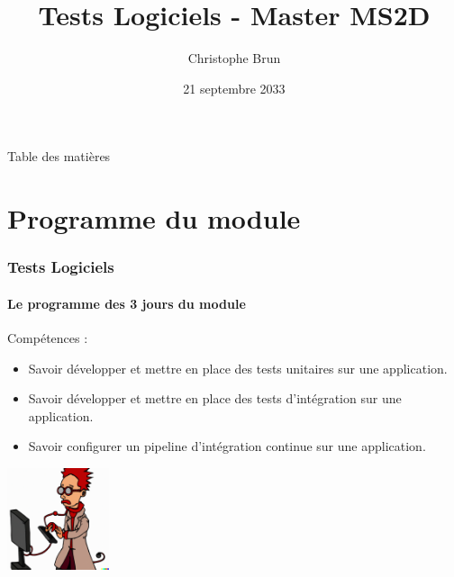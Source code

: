 \documentclass{beamer}
\title{Tests Logiciels - Master MS2D}
\author{Christophe Brun}
\institute{Campus Saint-Michel IT}
\date{21 septembre 2033}
\begin{document}
    \begin{frame}
        \transdissolve
        \titlepage
    \end{frame}

    \begin{frame}{Table des matières}
        \tableofcontents
    \end{frame}


    \section{Programme du module}
    \begin{frame}
        \frametitle{Tests Logiciels}
        \framesubtitle{Le programme des 3 jours du module}
        \transdissolve
        Compétences :
        \begin{itemize}
            \item Savoir développer et mettre en place des tests unitaires sur une application.

            \item Savoir développer et mettre en place des tests d’intégration sur une application.

            \item Savoir configurer un pipeline d’intégration continue sur une application.

        \end{itemize}
        \centering
        \includegraphics[width=3cm]{image/funny-cartoon-of-a-smart-young-computer-scientist.png}
    \end{frame}
\end{document}
